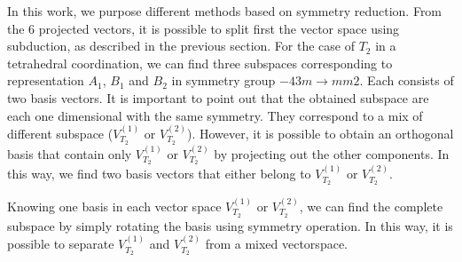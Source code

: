 \documentclass{article}
\begin{document}
In this work, we purpose different methods based on symmetry reduction. From the 6 projected 
vectors, it is possible to split first the vector space using subduction, as described in the 
previous section. For the case of $T_2$ in a tetrahedral coordination, we can find three 
subspaces corresponding to representation $A_1$, $B_1$ and $B_2$ in symmetry group $-43m\to mm2$. 
Each consists of two basis vectors. It is important to point out that the obtained subspace are 
each one dimensional with the same symmetry. They correspond to a mix of different subspace 
($V_{T_2}^{(1)}$ or $V_{T_2}^{(2)}$). However, it is possible to obtain an orthogonal basis 
that contain only $V_{T_2}^{(1)}$ or $V_{T_2}^{(2)}$ by projecting out the other components. 
In this way, we find two basis vectors that either belong to $V_{T_2}^{(1)}$ or $V_{T_2}^{(2)}$.

Knowing one basis in each vector space $V_{T_2}^{(1)}$ or $V_{T_2}^{(2)}$, we can find 
the complete subspace by simply rotating the basis using symmetry operation. In this way,
it is possible to separate $V_{T_2}^{(1)}$ and $V_{T_2}^{(2)}$ from a mixed vectorspace.
\end{document}
